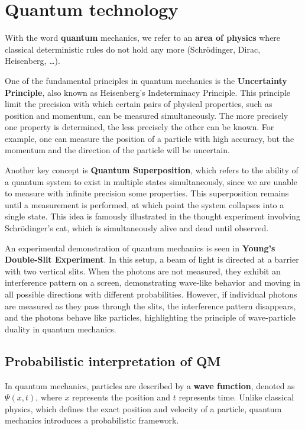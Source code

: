 \chapter{Quantum technology}
\label{ch:quantum}

With the word \textbf{quantum} mechanics, we refer to an \textbf{area
of physics} where classical deterministic rules do not hold any more
(Schrödinger, Dirac, Heisenberg, \dots).

One of the fundamental principles in quantum mechanics is the
\textbf{Uncertainty Principle}, also known as Heisenberg's
Indeterminacy Principle. This principle limit the precision with which
certain pairs of physical properties, such as position and momentum,
can be measured simultaneously. The more precisely one property is
determined, the less precisely the other can be known. For example,
one can measure the position of a particle with high accuracy, but the
momentum and the direction of the particle will be uncertain.

Another key concept is \textbf{Quantum Superposition}, which refers to
the ability of a quantum system to exist in multiple states
simultaneously, since we are unable to measure with infinite precision
some properties. This superposition remains until a measurement is
performed, at which point the system collapses into a single state.
This idea is famously illustrated in the thought experiment involving
Schrödinger's cat, which is simultaneously alive and dead until
observed.

An experimental demonstration of quantum mechanics is seen in
\textbf{Young's Double-Slit Experiment}. In this setup, a beam of
light is directed at a barrier with two vertical slits. When the
photons are not measured, they exhibit an interference pattern on a
screen, demonstrating wave-like behavior and moving in
all possible directions with different probabilities. However, if individual
photons are measured as they pass through the slits, the interference
pattern disappears, and the photons behave like particles,
highlighting the principle of wave-particle duality in quantum
mechanics.

\section{Probabilistic interpretation of QM}

In quantum mechanics, particles are described by a \textbf{wave
function}, denoted as \(\Psi(x,t)\), where \(x\) represents the
position and \(t\) represents time. Unlike classical physics, which
defines the exact position and velocity of a particle, quantum
mechanics introduces a probabilistic framework.

